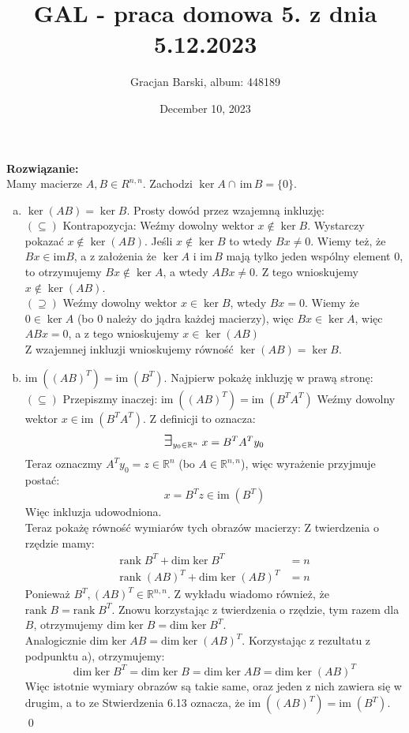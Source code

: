 \documentclass[10pt]{article}
\title{GAL - praca domowa 5. z dnia 5.12.2023}
\author{Gracjan Barski, album: 448189}
\date{December 10, 2023}
\newcommand{\R}{\mathbb{R}}
\newcommand{\Exists}{{\Large\mbox{$\exists$}}}
\begin{document}
\maketitle
\onehalfspacing
\textbf{Rozwiązanie:} \\[10pt]
Mamy macierze $A, B \in R^{n,n}$. Zachodzi $\ker A \cap \, \mathrm{im} \, B = \{0\}$. 
\begin{enumerate}[a)]
    \item $\ker (AB) = \ker B$. Prosty dowód przez wzajemną inkluzję: \\[5pt]
    $(\subseteq)$ Kontrapozycja: Weźmy dowolny wektor $x \notin \ker B$. Wystarczy pokazać $x \notin \ker (AB)$. Jeśli $x \notin \ker B$ to wtedy $Bx \neq 0$. Wiemy też, że $Bx \in \mathrm{im} B$, a z założenia że $\ker A$ i $\mathrm{im} \, B$ mają tylko jeden wspólny element $0$, to otrzymujemy $Bx \notin \ker A$, a wtedy $ABx \neq 0$. Z tego wnioskujemy $x \notin \ker (AB)$. \\[5pt]
    $(\supseteq)$ Weźmy dowolny wektor $x \in \ker B$, wtedy $Bx = 0$. Wiemy że $0 \in \ker A$ (bo 0 należy do jądra każdej macierzy), więc $Bx \in \ker A$, więc $ABx = 0$, a z tego wnioskujemy $x \in \ker (AB)$ \\[5pt]
    Z wzajemnej inkluzji wnioskujemy równość $\ker (AB) = \ker B$.

    \item $\mathrm{im} \; ((AB)^T) = \mathrm{im} \; (B^T)$. Najpierw pokażę inkluzję w prawą stronę:\\[5pt]
    $(\subseteq)$ Przepiszmy inaczej: $\mathrm{im} \; ((AB)^T) = \mathrm{im} \; (B^TA^T)$  Weźmy dowolny wektor $x \in \mathrm{im} \; (B^TA^T)$. Z definicji to oznacza:
    $$\Exists_{y_0 \in \R^n} \; x = B^TA^Ty_0$$
    Teraz oznaczmy $A^Ty_0 = z \in \R^n$ (bo $A \in \R^{n,n}$), więc wyrażenie przyjmuje postać:
    $$x = B^Tz \in \mathrm{im} \; (B^T)$$
    Więc inkluzja udowodniona. \\[5pt]
    Teraz pokażę równość wymiarów tych obrazów macierzy: Z twierdzenia o rzędzie mamy:
    \begin{align*}
        \mathrm{rank} \; B^T + \mathrm{dim \; ker} \; B^T &= n \\
        \mathrm{rank} \; (AB)^T + \mathrm{dim \; ker} \; (AB)^T &= n \end{align*}
    Ponieważ $B^T, (AB)^T \in \R^{n,n}$.
    Z wykładu wiadomo również, że $\mathrm{rank} \; B = \mathrm{rank} \; B^T$. Znowu korzystając z twierdzenia o rzędzie, tym razem dla $B$, otrzymujemy $\mathrm{dim \; ker} \; B = \mathrm{dim \; ker} \; B^T$. \\
    Analogicznie $\mathrm{dim \; ker} \; AB = \mathrm{dim \; ker} \; (AB)^T$. Korzystając z rezultatu z podpunktu a), otrzymujemy:
    $$\mathrm{dim \; ker} \; B^T = \mathrm{dim \; ker} \; B = \mathrm{dim \; ker} \; AB = \mathrm{dim \; ker} \; (AB)^T$$
    Więc istotnie wymiary obrazów są takie same, oraz jeden z nich zawiera się w drugim, a to ze Stwierdzenia 6.13 oznacza, że $\mathrm{im} \; ((AB)^T) = \mathrm{im} \; (B^T)$. \qed
\end{enumerate}
\end{document}
